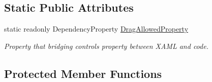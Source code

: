\subsection*{Static Public Attributes}
\begin{DoxyCompactItemize}
\item 
static readonly Dependency\+Property \mbox{\hyperlink{class_wpf_handler_1_1_u_i_1_1_controls_1_1_collection_control_aea4afe7ae229937f9c99809d720d8875}{Drag\+Allowed\+Property}}
\begin{DoxyCompactList}\small\item\em Property that bridging control\textquotesingle{}s property between X\+A\+ML and code. \end{DoxyCompactList}\end{DoxyCompactItemize}
\subsection*{Protected Member Functions}

